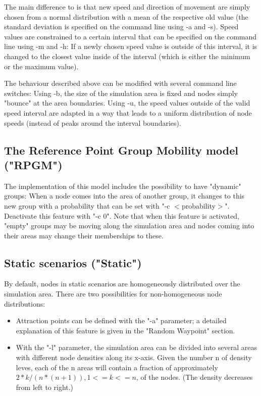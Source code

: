 \documentclass[11pt,a4paper,twoside,normalheadings,headsepline,DIV13,BCOR11mm,openright]{article}
\begin{document}
The main difference to \cite{camp_classification_2002} is that new
speed and direction of movement are simply chosen from a normal
distribution with a mean of the respective old value (the standard
deviation is specified on the command line using -a and -s). Speed
values are constrained to a certain interval that can be specified on
the command line using -m and -h: If a newly chosen speed value is
outside of this interval, it is changed to the closest value inside of
the interval (which is either the minimum or the maximum value).

The behaviour described above can be modified with several command
line switches: Using -b, the size of the simulation area is fixed and
nodes simply "bounce" at the area boundaries.  Using -u, the speed
values outside of the valid speed interval are adapted in a way that
leads to a uniform distribution of node speeds (instead of peaks
around the interval boundaries).


\subsection{The Reference Point Group Mobility model ("RPGM")}

The implementation of this model \cite{RPGM_99} includes the
possibility to have "dynamic" groups: When a node comes into the area
of another group, it changes to this new group with a probability that
can be set with "-c $<$probability$>$". Deactivate this feature with "-c
0". Note that when this feature is activated, "empty" groups may be
moving along the simulation area and nodes coming into their areas may
change their memberships to these.


\subsection{Static scenarios ("Static")}


By default, nodes in static scenarios are homogeneously distributed over
the  simulation  area.  There  are two possibilities for non-homogeneous
node distributions:

\begin{itemize}
\item Attraction points can be defined with the "-a" parameter; a  detailed
   explanation  of  this  feature  is  given  in  the  "Random Waypoint"
   section.

\item With the "-l" parameter, the simulation  area  can  be  divided  into
   several  areas  with different node densities along its x-axis. Given
   the number n of density leves, each of the n  areas  will  contain  a
   fraction of approximately
      $2 * k / (n * (n + 1)), 1 <= k <= n$,
   of the nodes. (The density decreases from left to right.)
\end{itemize}
\end{document}
